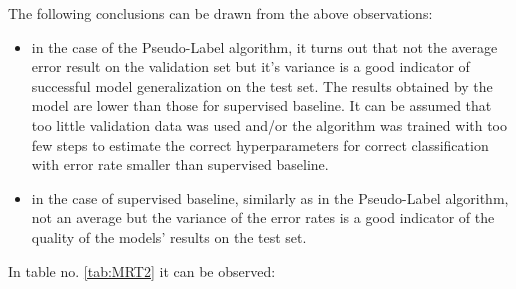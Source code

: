 \documentclass[12pt]{article}
\theoremstyle{definition}
\DeclareRobustCommand{\[}{\begin{equation}}
\DeclareRobustCommand{\]}{\end{equation}}
\begin{document}
\vspace{5mm} %
The following conclusions can be drawn from the above observations:
    \begin{itemize}
        \item in the case of the Pseudo-Label algorithm, it turns out that not the average error result on the validation set but it's variance is a good indicator of successful model generalization on the test set. The results obtained by the model are lower than those for supervised baseline. It can be assumed that too little validation data was used and/or the algorithm was trained with too few steps to estimate the correct hyperparameters for correct classification with  error rate smaller than supervised baseline.
        \item in the case of supervised baseline, similarly as in the Pseudo-Label algorithm, not an average but the variance of the error rates is a good indicator of the quality of the models' results on the test set. 
    \end{itemize}
\newline
\vspace{5mm} %
\vspace{5mm} %
In table no. \ref{tab:MRT2} it can be observed:
\end{document}
